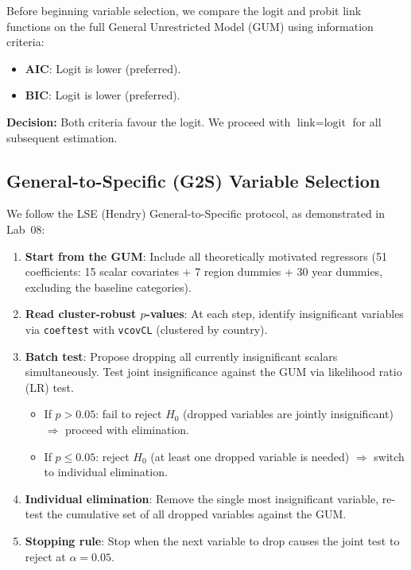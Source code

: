 \documentclass[12pt,a4paper]{article}
\begin{document}
Before beginning variable selection, we compare the logit and probit link functions on the full General Unrestricted Model (GUM) using information criteria:
\begin{itemize}
  \item \textbf{AIC}: Logit is lower (preferred).
  \item \textbf{BIC}: Logit is lower (preferred).
\end{itemize}
\textbf{Decision:} Both criteria favour the logit. We proceed with $\text{link} = \text{logit}$ for all subsequent estimation.

\subsection{General-to-Specific (G2S) Variable Selection}

We follow the LSE (Hendry) General-to-Specific protocol, as demonstrated in Lab~08:

\begin{enumerate}
  \item \textbf{Start from the GUM}: Include all theoretically motivated regressors (51 coefficients: 15 scalar covariates + 7 region dummies + 30 year dummies, excluding the baseline categories).
  \item \textbf{Read cluster-robust $p$-values}: At each step, identify insignificant variables via \texttt{coeftest} with \texttt{vcovCL} (clustered by country).
  \item \textbf{Batch test}: Propose dropping all currently insignificant scalars simultaneously. Test joint insignificance against the GUM via likelihood ratio (LR) test.
  \begin{itemize}
    \item If $p > 0.05$: fail to reject $H_0$ (dropped variables are jointly insignificant) $\Rightarrow$ proceed with elimination.
    \item If $p \leq 0.05$: reject $H_0$ (at least one dropped variable is needed) $\Rightarrow$ switch to individual elimination.
  \end{itemize}
  \item \textbf{Individual elimination}: Remove the single most insignificant variable, re-test the cumulative set of all dropped variables against the GUM.
  \item \textbf{Stopping rule}: Stop when the next variable to drop causes the joint test to reject at $\alpha = 0.05$.
\end{enumerate}
\end{document}
